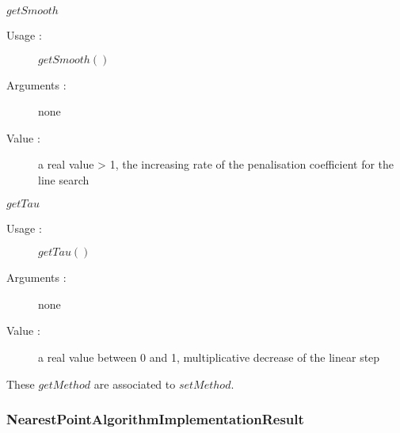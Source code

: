 \begin{description}
\begin{description}
  \item $getSmooth$
    \begin{description}
    \item[Usage :] $getSmooth()$
    \item[Arguments :] none
    \item[Value :]  a real value > 1, the increasing rate of the penalisation coefficient for the line search
    \end{description}
    \bigskip

  \item $getTau$
    \begin{description}
    \item[Usage :] $getTau()$
    \item[Arguments :] none
    \item[Value :]  a real value between 0 and 1, multiplicative decrease of the linear step
    \end{description}
    \bigskip
  \end{description}

  These  $getMethod$  are associated to  $setMethod$.
\end{description}

\newpage \subsubsection{NearestPointAlgorithmImplementationResult}


